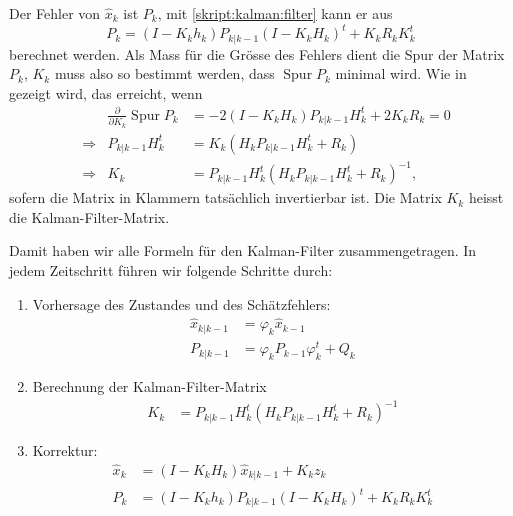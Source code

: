 Der Fehler von $\hat{x}_k$ ist $P_k$, mit \eqref{skript:kalman:filter}
kann er aus
\begin{equation}
P_k
=
(I-K_kh_k)P_{k|k-1}(I-K_kH_k)^t + K_kR_kK_k^t
\label{skript:fehler:korrektur}
\end{equation}
berechnet werden.
Als Mass für die Grösse des Fehlers dient die Spur der Matrix $P_k$,
$K_k$ muss also so bestimmt werden, dass $\operatorname{Spur} P_k$ 
minimal wird.
Wie in \cite{skript:wrstatskript} gezeigt wird, das erreicht, wenn
\[
\begin{aligned}
&&
\frac{\partial}{\partial K_k} \operatorname{Spur}P_k
&=
-2(I-K_kH_k)P_{k|k-1}H_k^t + 2K_kR_k
=
0
\\
&\Rightarrow&
P_{k|k-1}H_k^t
&=
K_k(H_kP_{k|k-1}H_k^t+R_k)
\\
&\Rightarrow&
K_k
&=
P_{k|k-1}H_k^t
(H_kP_{k|k-1}H_k^t+R_k)^{-1},
\end{aligned}
\]
sofern die Matrix in Klammern tatsächlich invertierbar ist.
Die Matrix $K_k$ heisst die Kalman-Filter-Matrix.
%

Damit haben wir alle Formeln für den Kalman-Filter zusammengetragen.
In jedem Zeitschritt führen wir folgende Schritte durch:
\begin{enumerate}
\item
Vorhersage des Zustandes und des Schätzfehlers:
\begin{align*}
\hat{x}_{k|k-1}&= \varphi_k\hat{x}_{k-1} \\
P_{k|k-1}      &= \varphi_kP_{k-1}\varphi_k^t + Q_k
\end{align*}
\item
Berechnung der Kalman-Filter-Matrix
\begin{align*}
K_k
&=
P_{k|k-1}H_k^t
(H_kP_{k|k-1}H_k^t+R_k)^{-1}
\end{align*}
\item
Korrektur:
\begin{align*}
\hat{x}_k&= (I-K_kH_k)\hat{x}_{k|k-1} + K_kz_k \\
P_k      &= 
(I-K_kh_k)P_{k|k-1}(I-K_kH_k)^t + K_kR_kK_k^t
\end{align*}
\end{enumerate}

